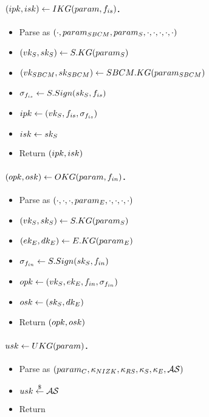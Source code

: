 \paragraph{$(ipk,isk) \gets IKG(param,f_{is})$.} %
\begin{itemize}
\item Parse \parm as $(\cdot,param_{SBCM},param_{S},\cdot,\cdot,\cdot,\cdot,\cdot)$
\item $(vk_{S},sk_{S}) \gets S.KG(param_{S})$
\item $(vk_{SBCM},sk_{SBCM}) \gets SBCM.KG(param_{SBCM})$  
\item $\sigma_{f_{is}} \gets S.Sign(sk_{S},f_{is})$
\item $ipk \gets (vk_{S},f_{is},\sigma_{f_{is}})$
\item $isk \gets sk_{S}$
\item Return $(ipk,isk)$
\end{itemize}

\paragraph{$(opk,osk) \gets OKG(param,f_{in})$.} %
\begin{itemize}
\item Parse \parm as $(\cdot,\cdot,\cdot,param_{E},\cdot,\cdot,\cdot,\cdot)$
\item $(vk_{S},sk_{S}) \gets S.KG(param_{S})$
\item $(ek_{E},dk_{E}) \gets E.KG(param_{E})$
\item $\sigma_{f_{in}} \gets S.Sign(sk_{S},f_{in})$
\item $opk \gets (vk_{S},ek_{E},f_{in},\sigma_{f_{in}})$
\item $osk \gets (sk_{S},dk_{E})$
\item Return $(opk,osk)$
\end{itemize}

\paragraph{$usk \gets UKG(param)$.} %
\begin{itemize}
\item Parse \parm as $(param_C,\kappa_{NIZK},\kappa_{RS},\kappa_{S},\kappa_{E},\mathcal{AS})$
\item $usk \stackrel{\$}{\gets} \mathcal{AS}$
\item Return \usk
\end{itemize}

